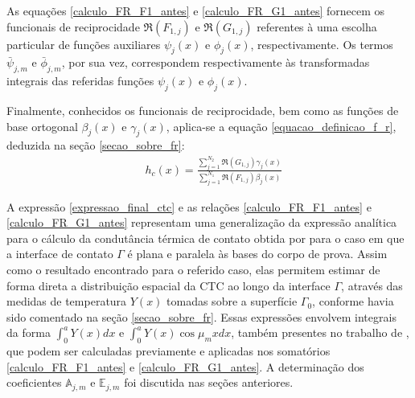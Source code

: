 As equações \eqref{calculo_FR_F1_antes} e \eqref{calculo_FR_G1_antes} fornecem os funcionais de reciprocidade $\Re(F_{1,j})$ e $\Re(G_{1,j})$ referentes à uma escolha particular de funções auxiliares $\psi_j(x)$ e $\phi_j(x)$, respectivamente. Os termos $\bar{\psi}_{j, m}$ e $\bar{\phi}_{j, m}$, por sua vez, correspondem respectivamente às transformadas integrais das referidas funções $\psi_j(x)$ e $\phi_j(x)$. 

Finalmente, conhecidos os funcionais de reciprocidade, bem como as funções de base ortogonal $\beta_j(x)$ e $\gamma_j(x)$, aplica-se a equação \eqref{equacao_definicao_f_r}, deduzida na seção \ref{secao_sobre_fr}:
\begin{align}
& h_c(x) %
= \frac{\displaystyle\sum_{j=1}^{N_2} \Re(G_{1,j}) \gamma_j(x)}{\displaystyle\sum_{j=1}^{N_1} \Re(F_{1,j}) \beta_j(x)} \label{expressao_final_ctc}
\end{align}

A expressão \eqref{expressao_final_ctc} e as relações \eqref{calculo_FR_F1_antes} e \eqref{calculo_FR_G1_antes} representam uma generalização da expressão analítica para o cálculo da condutância térmica de contato obtida por \cite{tese_padilha} para o caso em que a interface de contato $\Gamma$ é plana e paralela às bases do corpo de prova. Assim como o resultado encontrado para o referido caso, elas permitem estimar de forma direta a distribuição espacial da CTC ao longo da interface $\Gamma$, através das medidas de temperatura $Y(x)$ tomadas sobre a superfície $\Gamma_0$, conforme havia sido comentado na seção \ref{secao_sobre_fr}. Essas expressões envolvem integrais da forma $\displaystyle \int_0^a Y(x)dx$ e $\displaystyle \int_0^a Y(x)\cos\mu_m x dx$, também presentes no trabalho de \cite{tese_padilha}, que podem ser calculadas previamente e aplicadas nos somatórios \eqref{calculo_FR_F1_antes} e \eqref{calculo_FR_G1_antes}. A determinação dos coeficientes $\mathbb{A}_{j,m}$ e $\mathbb{E}_{j,m}$ foi discutida nas seções anteriores.


